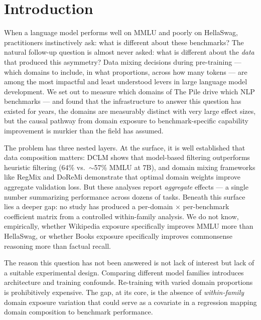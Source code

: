 \section{Introduction}

When a language model performs well on MMLU and poorly on HellaSwag, practitioners instinctively ask: what is different about these benchmarks? The natural follow-up question is almost never asked: what is different about the \textit{data} that produced this asymmetry? Data mixing decisions during pre-training --- which domains to include, in what proportions, across how many tokens --- are among the most impactful and least understood levers in large language model development. We set out to measure which domains of The Pile \cite{Gao2020Pile} drive which NLP benchmarks --- and found that the infrastructure to answer this question has existed for years, the domains are measurably distinct with very large effect sizes, but the causal pathway from domain exposure to benchmark-specific capability improvement is murkier than the field has assumed.

The problem has three nested layers. At the surface, it is well established that data composition matters: DCLM \cite{Li2024DCLM} shows that model-based filtering outperforms heuristic filtering (64\% vs.\ $\sim$57\% MMLU at 7B), and domain mixing frameworks like RegMix \cite{Liu2024RegMix} and DoReMi \cite{DoReMi2023} demonstrate that optimal domain weights improve aggregate validation loss. But these analyses report \textit{aggregate} effects --- a single number summarizing performance across dozens of tasks. Beneath this surface lies a deeper gap: no study has produced a per-domain $\times$ per-benchmark coefficient matrix from a controlled within-family analysis. We do not know, empirically, whether Wikipedia exposure specifically improves MMLU more than HellaSwag, or whether Books exposure specifically improves commonsense reasoning more than factual recall.

The reason this question has not been answered is not lack of interest but lack of a suitable experimental design. Comparing different model families introduces architecture and training confounds. Re-training with varied domain proportions is prohibitively expensive. The gap, at its core, is the absence of \textit{within-family} domain exposure variation that could serve as a covariate in a regression mapping domain composition to benchmark performance.

